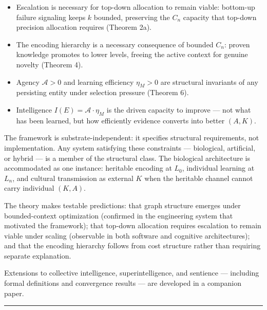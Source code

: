 \documentclass[
]{article}
\providecommand{\tightlist}{%
  \setlength{\itemsep}{0pt}\setlength{\parskip}{0pt}}
\begin{document}
\begin{itemize}
\tightlist
=======
  Graph-structured \(K\) is necessary: bounded context requires
  progressive disclosure, which requires sub-linear retrieval, which
  requires stored adjacency --- a graph (Theorems 2b, 2c).
>>>>>>> 319f447daa46f8c1e949fb7929535d1aa6396025
\item
  Escalation is necessary for top-down allocation to remain viable:
  bottom-up failure signaling keeps \(k\) bounded, preserving the
  \(C_n\) capacity that top-down precision allocation requires
  (Theorem 2a).
\item
  The encoding hierarchy is a necessary consequence of bounded \(C_n\):
  proven knowledge promotes to lower levels, freeing the active context
  for genuine novelty (Theorem 4).
\item
  Agency \(\mathcal{A} > 0\) and learning efficiency \(\eta_M > 0\) are
  structural invariants of any persisting entity under selection
  pressure (Theorem 6).
\item
  Intelligence \(I(E) = \mathcal{A} \cdot \eta_M\) is the driven
  capacity to improve --- not what has been learned, but how efficiently
  evidence converts into better \((A, K)\).
\end{itemize}

The framework is substrate-independent: it specifies structural
requirements, not implementation. Any system satisfying these
constraints --- biological, artificial, or hybrid --- is a member of the
structural class. The biological architecture is accommodated as one
instance: heritable encoding at \(L_0\), individual learning at
\(L_n\), and cultural transmission as external \(K\) when the heritable
channel cannot carry individual \((K, A)\).

The theory makes testable predictions: that graph structure emerges
under bounded-context optimization (confirmed in the engineering system
that motivated the framework); that top-down allocation requires escalation to remain viable under
scaling (observable in both software and cognitive architectures);
and that the encoding hierarchy follows from cost structure rather than
requiring separate explanation.

Extensions to collective intelligence, superintelligence, and sentience
--- including formal definitions and convergence results --- are
developed in a companion paper.

\begin{center}\rule{0.5\linewidth}{0.5pt}\end{center}
\end{document}
